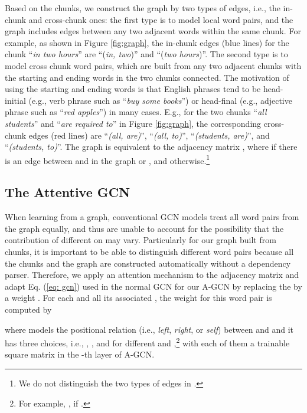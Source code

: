 \documentclass[11pt,a4paper]{article}
\begin{document}
Based on the chunks, we construct the graph by two types of edges, i.e., the in-chunk and cross-chunk ones:
the first type is to model local word pairs, and the graph includes edges
between any two adjacent words within the same chunk.
For example, as shown in Figure \ref{fig:graph}, the in-chunk edges (blue lines) for the chunk ``\textit{in two hours}'' are ``(\textit{in, two})''
and ``(\textit{two hours})''.
The second type is to model cross chunk word pairs, which are built from any two adjacent chunks with
the starting and ending words in the two chunks connected.
The motivation of using the starting and ending words is that English phrases tend to be head-initial (e.g., verb phrase such as ``\textit{buy some books}'') or head-final (e.g., adjective phrase such as ``\textit{red apples}'') in many cases. E.g.,
for the two chunks ``\textit{all students}'' and ``\textit{are required to}'' in Figure \ref{fig:graph}, the corresponding cross-chunk edges (red lines) are ``\textit{(all, are)}'', ``\textit{(all, to)}'', ``\textit{(students, are)}'', and ``\textit{(students, to)}''.
The graph is equivalent to the adjacency matrix , where  if there is an edge between  and  in the graph or , and  otherwise.\footnote{We do not distinguish the two types of edges in .}







\subsection{The Attentive GCN}

When learning from a graph, conventional GCN models treat all word pairs from the graph equally, and thus are unable to account for the possibility that the contribution of different 
 on  may vary. 
Particularly for our graph built from chunks, it is important to be able to distinguish different word pairs because all the chunks and the graph are constructed automatically without a dependency parser.
Therefore, we apply an attention mechanism to the adjacency matrix and adapt Eq. (\ref{eq: gcn}) used in the normal GCN for our A-GCN by replacing the  by a weight .
For each  and all its associated , the weight  for this word pair is computed by

where  models the positional relation (i.e., \textit{left}, \textit{right}, or \textit{self}) between  and  and it has three choices, i.e., , , and  for different  and ,\footnote{For example, , if .} with each of them a trainable square matrix in the -th layer of A-GCN.
\end{document}
